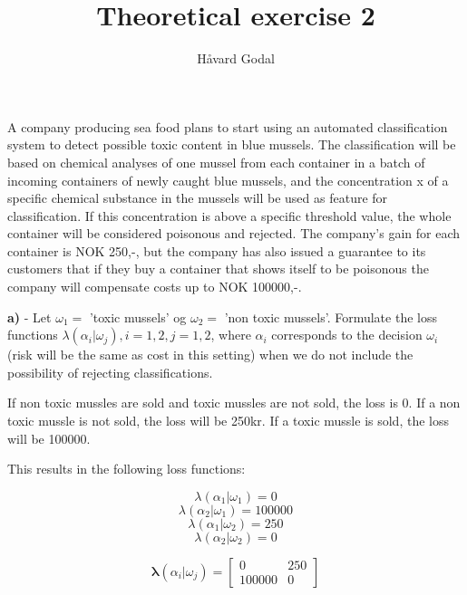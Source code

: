 \documentclass{homeworg}
\title{Theoretical exercise 2}
\author{Håvard Godal}
\begin{document}
\maketitle

\problem
A company producing sea food plans to start using 
an automated classification system to detect possible toxic content 
in blue mussels. The classification will be based on chemical analyses 
of one mussel from each container in a batch of incoming containers of 
newly caught blue mussels, and the concentration x of a specific chemical 
substance in the mussels will be used as feature for classification. 
If this concentration is above a specific threshold value, 
the whole container will be considered poisonous and rejected. 
The company’s gain for each container is NOK 250,-, 
but the company has also issued a guarantee to its customers that if 
they buy a container that shows itself to be poisonous the company 
will compensate costs up to NOK 100000,-.

\bigskip
\textbf{a)} - Let $\omega_1 =$ 'toxic mussels' og $\omega_2 =$ 'non toxic mussels'. Formulate the loss functions $\lambda(\alpha_i|\omega_j),i = 1,2,j = 1,2$, where $\alpha_i$ corresponds to the decision $\omega_i$ (risk will be the same as cost in this setting) when we do not include the possibility of rejecting classifications.
\smallskip

If non toxic mussles are sold and toxic mussles are not sold, the loss is 0.
If a non toxic mussle is not sold, the loss will be 250kr.
If a toxic mussle is sold, the loss will be 100000.

This results in the following loss functions:

\begin{equation}
    \lambda(\alpha_1 | \omega_1) = 0
\end{equation}
\begin{equation}
    \lambda(\alpha_2 | \omega_1) = 100000
\end{equation}
\begin{equation}
    \lambda(\alpha_1 | \omega_2) = 250
\end{equation}
\begin{equation}
    \lambda(\alpha_2 | \omega_2) = 0
\end{equation}

\begin{equation}
    \bm{\lambda}(\alpha_i | \omega_j) = 
    \begin{bmatrix}
        0 & 250 \\
        100000 & 0
    \end{bmatrix}
\end{equation}
\end{document}
